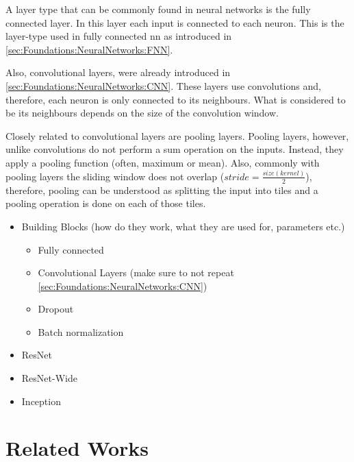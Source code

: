 A layer type that can be commonly found in neural networks is the fully connected layer. In this layer each input is connected to each neuron. This is the layer-type used in fully connected \ac{nn} as introduced in \autoref{sec:Foundations:NeuralNetworks:FNN}.

Also, convolutional layers, were already introduced in \autoref{sec:Foundations:NeuralNetworks:CNN}. These layers use convolutions and, therefore, each neuron is only connected to its neighbours. What is considered to be its neighbours depends on the size of the convolution window.

Closely related to convolutional layers are pooling layers. Pooling layers, however, unlike convolutions do not perform a sum operation on the inputs. Instead, they apply a pooling function (often, maximum or mean). Also, commonly with pooling layers the sliding window does not overlap ($stride = \frac{size(kernel)}{2}$), therefore, pooling can be understood as splitting the input into tiles and a pooling operation is done on each of those tiles. 



\begin{itemize}
    \item Building Blocks (how do they work, what they are used for, parameters etc.)
    \begin{itemize}
        \item Fully connected
        \item Convolutional Layers (make sure to not repeat \autoref{sec:Foundations:NeuralNetworks:CNN})
        \item Dropout
        \item Batch normalization
    \end{itemize}
    \item ResNet \cite{he2016deep}
    \item ResNet-Wide \cite{zagoruyko2016wide}
    \item Inception
\end{itemize}

\section{Related Works}
\label{sec:Foundations:RelatedWorks}


